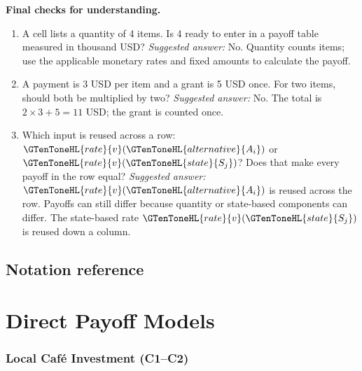 \textbf{Final checks for understanding.}
\begin{enumerate}
\item A cell lists a quantity of 4 items. Is 4 ready to enter in a payoff table measured in thousand USD? \emph{Suggested answer:} No. Quantity counts items; use the applicable monetary rates and fixed amounts to calculate the payoff.
\item A payment is 3 USD per item and a grant is 5 USD once. For two items, should both be multiplied by two? \emph{Suggested answer:} No. The total is $2\times3+5=11$ USD; the grant is counted once.
\item Which input is reused across a row: $\GTenToneHL{rate}{v}(\GTenToneHL{alternative}{A_i})$ or $\GTenToneHL{rate}{v}(\GTenToneHL{state}{S_j})$? Does that make every payoff in the row equal? \emph{Suggested answer:} $\GTenToneHL{rate}{v}(\GTenToneHL{alternative}{A_i})$ is reused across the row. Payoffs can still differ because quantity or state-based components can differ. The state-based rate $\GTenToneHL{rate}{v}(\GTenToneHL{state}{S_j})$ is reused down a column.
\end{enumerate}


\label{tone:reference}
\subsection*{Notation reference}
\section{Direct Payoff Models}
	\label{sec:direct-payoff-models}
\label{sec:direct-alternative-state-payoffs}


	\subsubsection{Local Café Investment (C1--C2)}
	\label{sec:problem3-local-cafe-investment-c1-c2}
	

